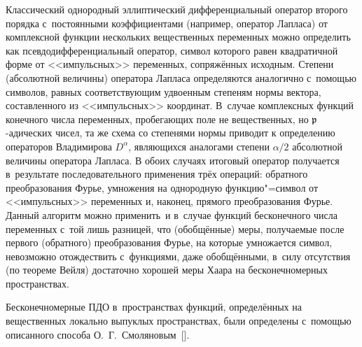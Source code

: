 Классический однородный эллиптический дифференциальный оператор второго порядка с~постоянными коэффициентами  (например, оператор Лапласа) от
 комплексной функции нескольких  вещественных переменных можно определить как
 псевдодифференциальный оператор, %
 символ которого равен квадратичной форме  от <<импульсных>> переменных, сопряжённых исходным.
 Степени (абсолютной величины) оператора Лапласа определяются  аналогично с~помощью символов, равных  соответствующим удвоенным
 степеням нормы вектора,  составленного из <<импульсных>> координат.
В~случае комплексных функций конечного числа переменных,  пробегающих поле не вещественных, но ${\mathfrak p}$-адических чисел, та же схема со степенями нормы
 приводит к определению операторов  Владимирова $D^\alpha$, являющихся аналогами степени $\alpha/2$ абсолютной величины оператора Лапласа.
В обоих случаях итоговый оператор %
получается в~результате %
последовательного применения трёх операций: обратного преобразования Фурье, умножения на  однородную функцию"=символ  от <<импульсных>> переменных
 и, наконец, прямого преобразования Фурье.
Данный алгоритм можно применить~и в~случае функций бесконечного числа переменных с~той  лишь разницей, что (обобщённые) меры,  получаемые после первого (обратного)  преобразования Фурье, на которые умножается символ,  невозможно отождествить с~функциями,  даже обобщёнными,  в~силу отсутствия (по теореме Вейля)  достаточно хорошей  меры Хаара на бесконечномерных  пространствах.

Бесконечномерные ПДО в~пространствах функций,  определённых на вещественных локально выпуклых пространствах,  были определены с~помощью описанного  способа О.~Г.~Смоляновым~[].

\smallskip

